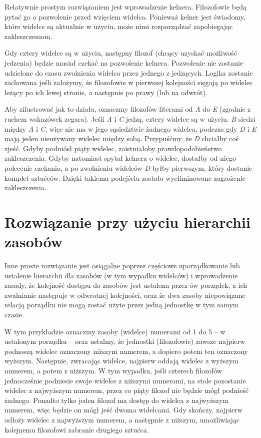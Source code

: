 \documentclass[a4paper, 12pt]{report}
\begin{document}
Relatywnie prostym rozwiązaniem jest wprowadzenie kelnera. Filozofowie będą pytać go o pozwolenie przed wzięciem widelca. Ponieważ kelner jest świadomy, które widelce są aktualnie w użyciu, może nimi rozporządzać zapobiegając zakleszczeniom.

Gdy cztery widelce są w użyciu, następny filozof (chcący uzyskać możliwość jedzenia) będzie musiał czekać na pozwolenie kelnera. Pozwolenie nie zostanie udzielone do czasu zwolnienia widelca przez jednego z jedzących. Logika zostanie zachowana jeśli założymy, że filozofowie w pierwszej kolejności sięgają po widelec leżący po ich lewej stronie, a następnie po prawy (lub na odwrót).

Aby zilustrować jak to działa, oznaczmy filozofów literami od \emph{A} do \emph{E} (zgodnie z ruchem wskazówek zegara). Jeśli \emph{A} i \emph{C} jedzą, cztery widelce są w użyciu. \emph{B} siedzi między \emph{A} i \emph{C}, więc nie ma w jego sąsiedztwie żadnego widelca, podczas gdy \emph{D} i \emph{E} mają jeden nieużywany widelec między sobą. Przypuśćmy, że \emph{D} chciałby coś zjeść. Gdyby podniósł piąty widelec, zaistniałoby prawdopodobieństwo zakleszczenia. Gdyby natomiast spytał kelnera o widelec, dostałby od niego polecenie czekania, a po zwolnieniu widelców \emph{D} byłby pierwszym, który dostanie komplet sztućców. Dzięki takiemu podejściu zostało wyeliminowane zagrożenie zakleszczenia.

\section{Rozwiązanie przy użyciu hierarchii zasobów}

Inne proste rozwiązanie jest osiągalne poprzez częściowe uporządkowanie lub ustalenie hierarchii dla zasobów (w tym wypadku widelców) i wprowadzenie zasady, że kolejność dostępu do zasobów jest ustalona przez ów porządek, a ich zwalnianie następuje w odwrotnej kolejności, oraz że dwa zasoby niepowiązane relacją porządku nie mogą zostać użyte przez jedną jednostkę w tym samym czasie.

W tym przykładzie oznaczmy zasoby (widelce) numerami od 1 do 5 – w ustalonym porządku – oraz ustalmy, że jednostki (filozofowie) zawsze najpierw podnoszą widelec oznaczony niższym numerem, a dopiero potem ten oznaczony wyższym. Następnie, zwracając widelce, najpierw oddają widelec z wyższym numerem, a potem z niższym. W tym wypadku, jeśli czterech filozofów jednocześnie podniesie swoje widelce z niższymi numerami, na stole pozostanie widelec z najwyższym numerem, przez co piąty filozof nie będzie mógł podnieść żadnego. Ponadto tylko jeden filozof ma dostęp do widelca z najwyższym numerem, więc będzie on mógł jeść dwoma widelcami. Gdy skończy, najpierw odłoży widelec z najwyższym numerem, a następnie z niższym, umożliwiając kolejnemu filozofowi zabranie drugiego sztućca.
\end{document}
